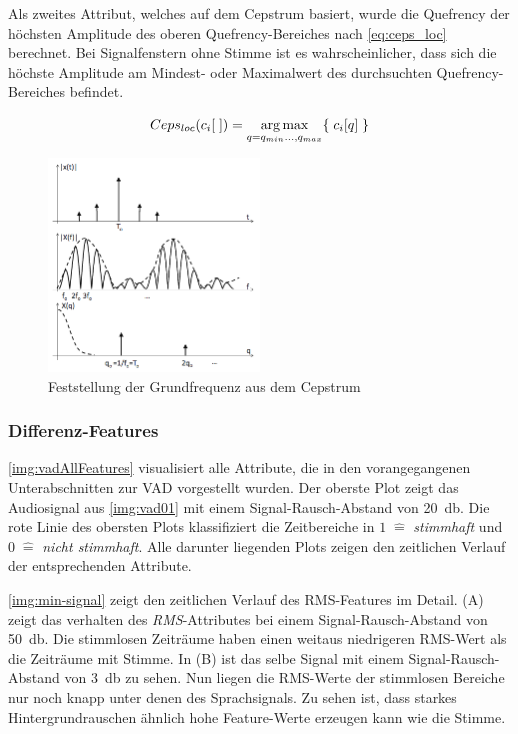 Als zweites Attribut, welches auf dem Cepstrum basiert, wurde die Quefrency der höchsten Amplitude des oberen Quefrency-Bereiches nach \autoref{eq:ceps_loc} berechnet. Bei Signalfenstern ohne Stimme ist es wahrscheinlicher, dass sich die höchste Amplitude am Mindest- oder Maximalwert des durchsuchten Quefrency-Bereiches befindet.

\begin{equation}
Ceps_{loc}(c_i[\;]) = \operatorname*{arg\,max}_{q = q_{min} \ldots , q_{max}} \{ \; c_i[q] \; \}
\label{eq:ceps_loc}
\end{equation}	

\begin{figure}[h]
	\centering
	\includegraphics[width=0.5\textwidth]{bilder/cepstrumPitch.png}
	\caption[Feststellung der Grundfrequenz aus dem Cepstrum]{Feststellung der Grundfrequenz aus dem Cepstrum \cite[S. 5]{cepstrumPitchTranslation}}
	\label{img:cepstrumPitch}
\end{figure}

\subsubsection{Differenz-Features}
\label{sec:vad_dif_feature}

\autoref{img:vadAllFeatures} visualisiert alle Attribute, die in den vorangegangenen Unterabschnitten zur VAD vorgestellt wurden. Der oberste Plot zeigt das Audiosignal aus \autoref{img:vad01} mit einem Signal-Rausch-Abstand von \SI{20}{\decibel}. Die rote Linie des obersten Plots klassifiziert die Zeitbereiche in $1 \; \hat{=} $ \emph{stimmhaft} und $0 \; \hat{=}$ \emph{nicht stimmhaft}. Alle darunter liegenden Plots zeigen den zeitlichen Verlauf der entsprechenden Attribute.

\autoref{img:min-signal} zeigt den zeitlichen Verlauf des RMS-Features im Detail. (A) zeigt das verhalten des \emph{RMS}-Attributes bei einem Signal-Rausch-Abstand von \SI{50}{\decibel}. Die stimmlosen Zeiträume haben einen weitaus niedrigeren RMS-Wert als die Zeiträume mit Stimme. In (B) ist das selbe Signal mit einem Signal-Rausch-Abstand von \SI{3}{\decibel} zu sehen. Nun liegen die RMS-Werte der stimmlosen Bereiche nur noch knapp unter denen des Sprachsignals. Zu sehen ist, dass starkes Hintergrundrauschen ähnlich hohe Feature-Werte erzeugen kann wie die Stimme.

